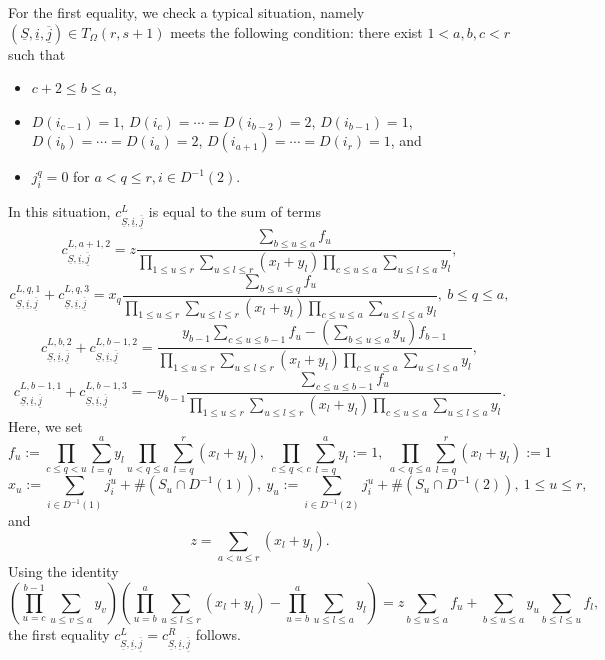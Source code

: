 \documentclass[12pt, a4paper]{article}
\begin{document}
For the first equality, we check a typical situation, namely  \( (\underline{S}, \underline{i}, \underline{\overline{j}}) \in T_{\Omega}(r, s+1) \) meets the following condition: there exist $1< a,b,c<r$ such that 
\begin{itemize}
\item $c+2\leq b\leq a$,
    \item $D(i_{c-1})=1$, $D(i_c)=\cdots=D(i_{b-2})=2$, $D(i_{b-1})=1$, $D(i_b)=\cdots=D(i_a)=2$, $D(i_{a+1})=\cdots=D(i_r)=1$, and
    \item $j^q_i=0$ for $a<q\leq r,i\in D^{-1}(2)$.
\end{itemize}
In this situation, $c^L_{\underline{S},\underline{i},\underline{\overline{j}}}$ is equal to the sum of terms
$$
c^{L,a+1,2}_{\underline{S},\underline{i},\underline{\overline{j}}}=z\frac{\sum_{b\leq u\leq a}f_u}{\prod_{1\leq u\leq r}\sum_{u\leq l\leq r}(x_l+y_l)\prod_{c\leq u\leq a}\sum_{u\leq l\leq a}y_l},
$$
$$
c^{L,q,1}_{\underline{S},\underline{i},\underline{\overline{j}}}+c^{L,q,3}_{\underline{S},\underline{i},\underline{\overline{j}}}=x_q\frac{\sum_{b\leq u\leq q}f_u}{\prod_{1\leq u\leq r}\sum_{u\leq l\leq r}(x_l+y_l)\prod_{c\leq u\leq a}\sum_{u\leq l\leq a}y_l},~b\leq q\leq a,$$
$$
c^{L,b,2}_{\underline{S},\underline{i},\underline{\overline{j}}}+
c^{L,b-1,2}_{\underline{S},\underline{i},\underline{\overline{j}}}=\frac{y_{b-1}\sum_{c\leq u\leq b-1}f_u-(\sum_{b\leq u\leq a}y_u)f_{b-1}}{\prod_{1\leq u\leq r}\sum_{u\leq l\leq r}(x_l+y_l)\prod_{c\leq u\leq a}\sum_{u\leq l\leq a}y_l},$$
$$
c^{L,b-1,1}_{\underline{S},\underline{i},\underline{\overline{j}}}+c^{L,b-1,3}_{\underline{S},\underline{i},\underline{\overline{j}}}=-y_{b-1}\frac{\sum_{c\leq u\leq b-1}f_u}{\prod_{1\leq u\leq r}\sum_{u\leq l\leq r}(x_l+y_l)\prod_{c\leq u\leq a}\sum_{u\leq l\leq a}y_l}.$$
Here, we set 
$$
f_u:=\prod_{c\leq q<u}\sum_{l=q}^ay_l\prod_{u<q\leq a}\sum_{l=q}^r(x_l+y_l),~\prod_{c\leq q<c}\sum_{l=q}^ay_l:=1,~\prod_{a<q\leq a}\sum_{l=q}^r(x_l+y_l):=1$$
$$
x_u:=\sum_{i\in D^{-1}(1)}j^u_i+\#(S_u\cap D^{-1}(1)),~y_u:=\sum_{i\in D^{-1}(2)}j^u_i+\#(S_u\cap D^{-1}(2)),~1\leq u\leq r,$$
and 
$$z=\sum_{a<u\leq r}(x_l+y_l).$$
Using the identity
$$
(\prod_{u=c}^{b-1}\sum_{u\leq v\leq a}y_v)(\prod_{u=b}^a\sum_{u\leq l\leq r}(x_l+y_l)-\prod_{u=b}^a\sum_{u\leq l\leq a}y_l)=z\sum_{b\leq u\leq a}f_u+\sum_{b\leq u\leq a}y_u\sum_{b\leq l\leq u}f_l,
$$
the first equality $c^L_{\underline{S},\underline{i},\underline{\overline{j}}}
= c^R_{\underline{S},\underline{i},\underline{\overline{j}}}$ follows.
\end{document}
